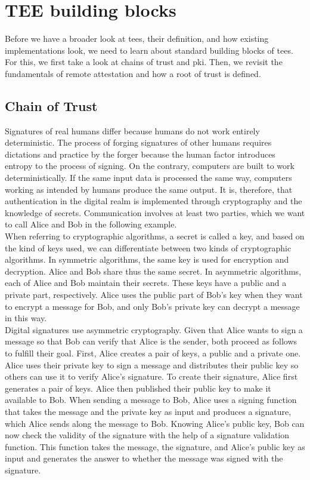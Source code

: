 \section{TEE building blocks}
\label{sec:20:building_blocks}
Before we have a broader look at \glspl{tee}, their definition, and how existing
implementations look, we need to learn about standard building blocks of
\glspl{tee}. For this, we first take a look at chains of trust and \gls{pki}.
Then, we revisit the fundamentals of remote attestation and how a root of
trust is defined.

\subsection{Chain of Trust}
\label{sec:20:chain_of_trust}
Signatures of real humans differ because humans do not work entirely
deterministic. The process of forging signatures of other humans requires
dictations and practice by the forger because the human factor introduces
entropy to the process of signing. On the contrary, computers are built to work
deterministically. If the same input data is processed the same way, computers
working as intended by humans produce the same output. It is, therefore, that
authentication in the digital realm is implemented through cryptography and the
knowledge of secrets. Communication involves at least two parties, which we want
to call Alice and Bob in the following example.\\

When referring to cryptographic algorithms, a secret is called a key, and based
on the kind of keys used, we can differentiate between two kinds of
cryptographic algorithms. In symmetric algorithms, the same key is used for
encryption and decryption. Alice and Bob share thus the same secret. In
asymmetric algorithms, each of Alice and Bob maintain their secrets. These keys
have a public and a private part, respectively. Alice uses the public part of
Bob's key when they want to encrypt a message for Bob, and only Bob's private
key can decrypt a message in this way.\\

Digital signatures use asymmetric cryptography. Given that Alice wants to sign a
message so that Bob can verify that Alice is the sender, both proceed as follows
to fulfill their goal. First, Alice creates a pair of keys, a public and a
private one. Alice uses their private key to sign a message and distributes
their public key so others can use it to verify Alice's signature. To create
their signature, Alice first generates a pair of keys. Alice then published
their public key to make it available to Bob. When sending a message to Bob,
Alice uses a signing function that takes the message and the private key as
input and produces a signature, which Alice sends along the message to Bob.
Knowing Alice's public key, Bob can now check the validity of the signature with
the help of a signature validation function. This function takes the message,
the signature, and Alice's public key as input and generates the answer to
whether the message was signed with the signature.\\

